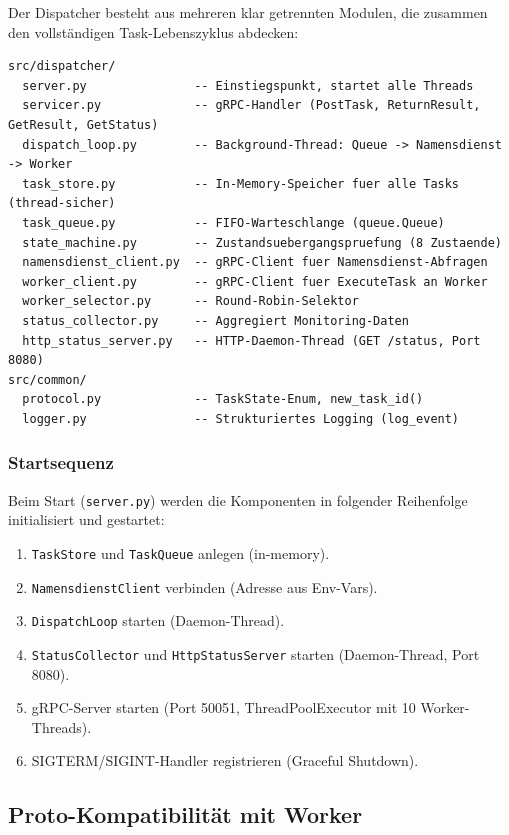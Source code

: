 Der Dispatcher besteht aus mehreren klar getrennten Modulen, die zusammen den
vollständigen Task-Lebenszyklus abdecken:

\begin{lstlisting}[language={},caption={Dispatcher-Komponenten (src/dispatcher/)}]
src/dispatcher/
  server.py               -- Einstiegspunkt, startet alle Threads
  servicer.py             -- gRPC-Handler (PostTask, ReturnResult, GetResult, GetStatus)
  dispatch_loop.py        -- Background-Thread: Queue -> Namensdienst -> Worker
  task_store.py           -- In-Memory-Speicher fuer alle Tasks (thread-sicher)
  task_queue.py           -- FIFO-Warteschlange (queue.Queue)
  state_machine.py        -- Zustandsuebergangspruefung (8 Zustaende)
  namensdienst_client.py  -- gRPC-Client fuer Namensdienst-Abfragen
  worker_client.py        -- gRPC-Client fuer ExecuteTask an Worker
  worker_selector.py      -- Round-Robin-Selektor
  status_collector.py     -- Aggregiert Monitoring-Daten
  http_status_server.py   -- HTTP-Daemon-Thread (GET /status, Port 8080)
src/common/
  protocol.py             -- TaskState-Enum, new_task_id()
  logger.py               -- Strukturiertes Logging (log_event)
\end{lstlisting}

\subsubsection*{Startsequenz}

Beim Start (\texttt{server.py}) werden die Komponenten in folgender Reihenfolge
initialisiert und gestartet:

\begin{enumerate}
  \item \texttt{TaskStore} und \texttt{TaskQueue} anlegen (in-memory).
  \item \texttt{NamensdienstClient} verbinden (Adresse aus Env-Vars).
  \item \texttt{DispatchLoop} starten (Daemon-Thread).
  \item \texttt{StatusCollector} und \texttt{HttpStatusServer} starten (Daemon-Thread, Port 8080).
  \item gRPC-Server starten (Port 50051, ThreadPoolExecutor mit 10 Worker-Threads).
  \item SIGTERM/SIGINT-Handler registrieren (Graceful Shutdown).
\end{enumerate}

\subsection{Proto-Kompatibilität mit Worker}
\label{sec:dispatcher-proto}

